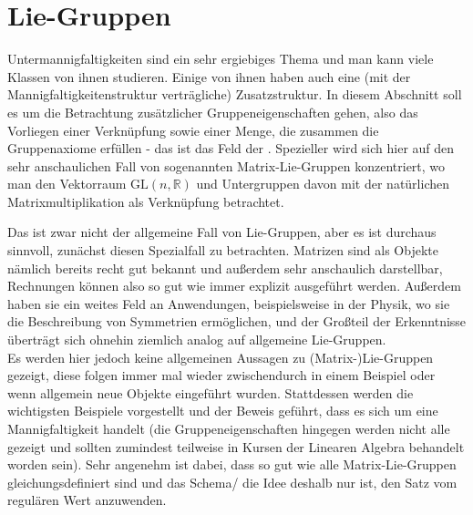\documentclass[../H_Analysis_main.tex]{subfiles}
\begin{document}
\newpage


	\section{Lie-Gruppen}
Untermannigfaltigkeiten sind ein sehr ergiebiges Thema und man kann viele Klassen von ihnen studieren. Einige von ihnen haben auch eine (mit der Mannigfaltigkeitenstruktur verträgliche) Zusatzstruktur. In diesem Abschnitt soll es um die Betrachtung zusätzlicher Gruppeneigenschaften gehen, also das Vorliegen einer Verknüpfung sowie einer Menge, die zusammen die Gruppenaxiome erfüllen - das ist das Feld der . Spezieller wird sich hier auf den sehr anschaulichen Fall von sogenannten Matrix-Lie-Gruppen konzentriert, wo man den Vektorraum $\text{GL}(n, \mathbb{R})$ und Untergruppen davon mit der natürlichen Matrixmultiplikation als Verknüpfung betrachtet.

Das ist zwar nicht der allgemeine Fall von Lie-Gruppen, aber es ist durchaus sinnvoll, zunächst diesen Spezialfall zu betrachten. Matrizen sind als Objekte nämlich bereits recht gut bekannt und außerdem sehr anschaulich darstellbar, Rechnungen können also so gut wie immer explizit ausgeführt werden. Außerdem haben sie ein weites Feld an Anwendungen, beispielsweise in der Physik, wo sie die Beschreibung von Symmetrien ermöglichen, und der Großteil der Erkenntnisse überträgt sich ohnehin ziemlich analog auf allgemeine Lie-Gruppen.\\


Es werden hier jedoch keine allgemeinen Aussagen zu (Matrix-)Lie-Gruppen gezeigt, diese folgen immer mal wieder zwischendurch in einem Beispiel oder wenn allgemein neue Objekte eingeführt wurden. Stattdessen werden die wichtigsten Beispiele vorgestellt und der Beweis geführt, dass es sich um eine Mannigfaltigkeit handelt (die Gruppeneigenschaften hingegen werden nicht alle gezeigt und sollten zumindest teilweise in Kursen der Linearen Algebra behandelt worden sein). Sehr angenehm ist dabei, dass so gut wie alle Matrix-Lie-Gruppen gleichungsdefiniert sind und das Schema/ die Idee deshalb nur ist, den Satz vom regulären Wert anzuwenden.
\end{document}
